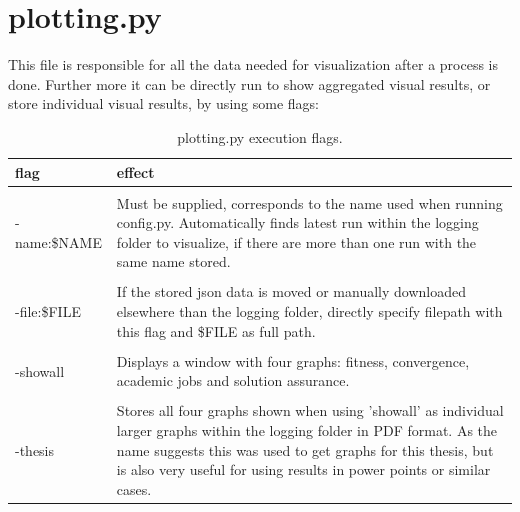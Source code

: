 \documentclass[a4paper,english]{report}
\begin{document}
\section{plotting.py}
This file is responsible for all the data needed for visualization after a process is done. Further more it can be directly run to show aggregated visual results, or store individual visual results, by using some flags:
\begin{table}[H]
	\centering
	\caption{plotting.py execution flags.}
	\label{table:config_flags2}
	\begin{tabular}{p{4cm}p{7cm}}
		\\
		\multicolumn{1}{l}{\bfseries flag} & \multicolumn{1}{l}{\bfseries effect} \\ \hline \\
		-name:\$NAME& Must be supplied, corresponds to the name used when running config.py. Automatically finds latest run within the logging folder to visualize, if there are more than one run with the same name stored. \\
		\\
		-file:\$FILE & If the stored json data is moved or manually downloaded elsewhere than the logging folder, directly specify filepath with this flag and \$FILE as full path. \\
		\\
		-showall & Displays a window with four graphs: fitness, convergence, academic jobs and solution assurance.  \\
		\\
		-thesis & Stores all four graphs shown when using 'showall' as individual larger graphs within the logging folder in PDF format. As the name suggests this was used to get graphs for this thesis, but is also very useful for using results in power points or similar cases. \\
	\end{tabular}

\end{table}
\end{document}
